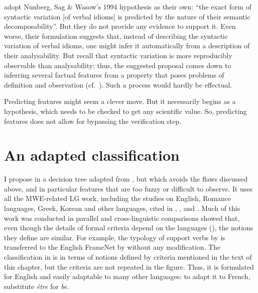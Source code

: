 \documentclass[output=paper]{langsci/langscibook}
\begin{document}
\cite[280]{Baldwin2010} adopt Nunberg, Sag \& Wasow's 1994 hypothesis as their own: “the exact form of syntactic variation [of verbal idioms] is predicted by the nature of their semantic decomposability”. But they do not provide any evidence to support it. Even worse, their formulation suggests that, instead of describing the syntactic variation of verbal idioms, one might infer it automatically from a description of their analysability. But recall that syntactic variation is  more reproducibly observable than analysability: thus, the suggested proposal comes down to inferring several factual features from a property that poses problems of definition and observation (cf.\ ). Such a process would hardly be effectual.

Predicting features might seem a clever move. But it necessarily begins as a hypothesis, which needs to be checked to get any scientific value. So, predicting features does not allow for bypassing the verification step.

\section{An adapted classification}
\label{sec:6}

I propose in  a decision tree adapted from \citet[279]{Baldwin2010}, but which avoids the flaws discussed above, and in particular features that are too fuzzy or difficult to observe. It uses all the MWE-related  LG work, including the studies on  English, Romance languages,  Greek,  Korean and other languages, cited in  , ,  and . Much of this work was conducted in parallel and cross-linguistic comparisons showed that, even though the details of formal criteria depend on the languages (), the notions they define are similar. For example, the typology of  support verbs by \citet{Gross1998} is transferred to the English FrameNet by \cite[37--38]{Ruppenhofer}  without any modification. The classification in  is in terms of notions defined by criteria mentioned in the text of this chapter, but the criteria are not repeated in the figure. Thus, it is formulated for English and easily adaptable to many other languages: to adapt it to French, substitute \textit{être} for \textit{be}.
\end{document}
